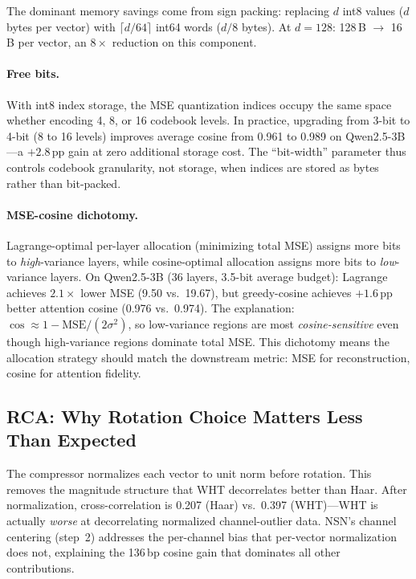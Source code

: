 \documentclass[sigconf,anonymous,review]{acmart}
\begin{document}
The dominant memory savings come from sign packing: replacing
$d$ int8 values ($d$ bytes per vector) with $\lceil d/64 \rceil$
int64 words ($d/8$ bytes). At $d=128$: 128\,B $\to$ 16\,B per
vector, an $8\times$ reduction on this component.

\paragraph{Free bits.}
With int8 index storage, the MSE quantization indices
occupy the same space whether encoding 4, 8, or 16 codebook levels.
In practice, upgrading from 3-bit to 4-bit (8 to 16 levels) improves
average cosine from 0.961 to 0.989 on Qwen2.5-3B---a $+2.8$\,pp
gain at zero additional storage cost. The ``bit-width'' parameter
thus controls codebook granularity, not storage, when indices are
stored as bytes rather than bit-packed.

\paragraph{MSE-cosine dichotomy.}
Lagrange-optimal per-layer allocation (minimizing total MSE) assigns
more bits to \emph{high}-variance layers, while cosine-optimal
allocation assigns more bits to \emph{low}-variance layers.
On Qwen2.5-3B (36 layers, 3.5-bit average budget):
Lagrange achieves $2.1\times$ lower MSE (9.50 vs.\ 19.67), but
greedy-cosine achieves $+1.6$\,pp better attention cosine
(0.976 vs.\ 0.974). The explanation:
$\cos \approx 1 - \text{MSE}/(2\sigma^2)$, so low-variance regions
are most \emph{cosine-sensitive} even though high-variance regions
dominate total MSE. This dichotomy means the allocation strategy
should match the downstream metric: MSE for reconstruction,
cosine for attention fidelity.

\subsection{RCA: Why Rotation Choice Matters Less Than Expected}

The compressor normalizes each vector to unit norm before rotation.
This removes the magnitude structure that WHT decorrelates better
than Haar. After normalization, cross-correlation is 0.207 (Haar)
vs.\ 0.397 (WHT)---WHT is actually \emph{worse} at decorrelating
normalized channel-outlier data. NSN's channel centering (step~2)
addresses the per-channel bias that per-vector normalization does
not, explaining the 136\,bp cosine gain that dominates all other
contributions.
\end{document}

